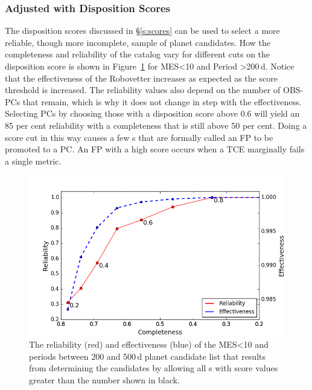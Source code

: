 \subsubsection{Adjusted with Disposition Scores}
\label{s:crscores}
The disposition scores discussed in \S\ref{s:scores} can be used to select a more reliable, though more incomplete, sample of planet candidates.  How the completeness and reliability of the catalog vary for different cuts on the disposition score is shown in Figure~\ref{f:adjscore} for MES<10 and Period >200\,d. Notice that the effectiveness of the Robovetter increases as expected as the score threshold is increased.  The reliability values also depend on the number of OBS-PCs that remain, which is why it does not change in step with the effectiveness.  Selecting PCs by choosing those with a disposition score above 0.6 will yield an 85 per cent reliability with a completeness that is still above 50 per cent. Doing a score cut in this way causes a few \opstce s that are formally called an FP to be promoted to a PC. An FP with a high score occurs when a TCE marginally fails a single metric.

\begin{figure}[h!]
 \begin{center}
  \includegraphics[width=1.0\linewidth]{fig-CRadjustScore-DR25.png}
  \caption{\label{f:adjscore}The reliability (red) and effectiveness (blue) of the MES<10 and periods between 200 and 500\,d planet candidate list that results from determining the candidates by allowing all \opstce s with score values greater than the number shown in black.}
 \end{center}
 \end{figure}


